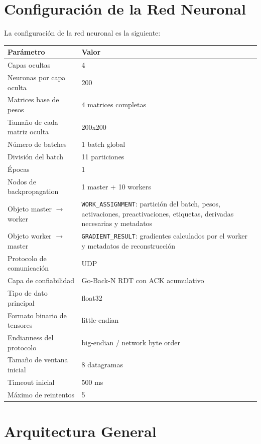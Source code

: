 \documentclass[12pt]{article}
\begin{document}
\section{Configuración de la Red Neuronal}

La configuración de la red neuronal es la siguiente:

\begin{table}[h]
\centering
\begin{tabular}{|p{4.5cm}|p{9cm}|}
\hline
Parámetro & Valor \\
\hline
Capas ocultas & 4 \\
\hline
Neuronas por capa oculta & 200 \\
\hline
Matrices base de pesos & 4 matrices completas \\
\hline
Tamaño de cada matriz oculta & 200x200 \\
\hline
Número de batches & 1 batch global \\
\hline
División del batch & 11 particiones \\
\hline
Épocas & 1 \\
\hline
Nodos de backpropagation & 1 master + 10 workers \\
\hline
Objeto master $\rightarrow$ worker & \texttt{WORK\_ASSIGNMENT}: partición del batch, pesos, activaciones, preactivaciones, etiquetas, derivadas necesarias y metadatos \\
\hline
Objeto worker $\rightarrow$ master & \texttt{GRADIENT\_RESULT}: gradientes calculados por el worker y metadatos de reconstrucción \\
\hline
Protocolo de comunicación & UDP \\
\hline
Capa de confiabilidad & Go-Back-N RDT con ACK acumulativo \\
\hline
Tipo de dato principal & float32 \\
\hline
Formato binario de tensores & little-endian \\
\hline
Endianness del protocolo & big-endian / network byte order \\
\hline
Tamaño de ventana inicial & 8 datagramas \\
\hline
Timeout inicial & 500 ms \\
\hline
Máximo de reintentos & 5 \\
\hline
\end{tabular}
\end{table}



\section{Arquitectura General}
\end{document}
